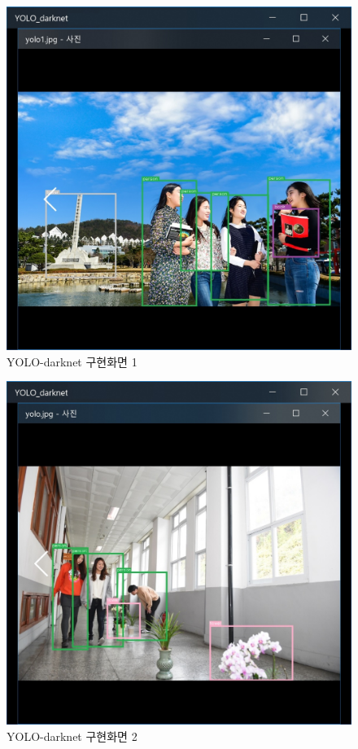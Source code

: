 \documentclass{article}
\begin{document}
\begin{figure}[h!]
\centering
\includegraphics[scale=0.3]
{how/YOLO_darknet_1.jpg}
\caption{YOLO-darknet 구현화면 1}
\label{fig:detect}
\end{figure}

\begin{figure}[h!]
\centering
\includegraphics[scale=0.3]
{how/YOLO_darknet_.jpg}
\caption{YOLO-darknet 구현화면 2}
\label{fig:detect}
\end{figure}
\end{document}
